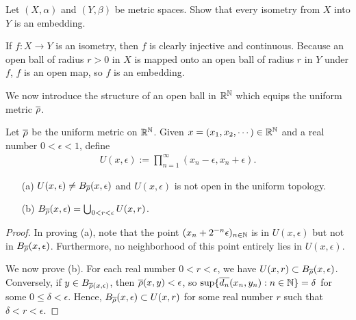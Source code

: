\begin{prob}
    Let $(X, \alpha)$ and $(Y, \beta)$ be metric spaces.
    Show that every isometry from $X$ into $Y$ is an embedding.
\end{prob}
\begin{sol}
    If $f: X\rightarrow Y$ is an isometry, then $f$ is clearly injective and continuous.
    Because an open ball of radius $r>0$ in $X$ is mapped onto an open ball of radius $r$ in $Y$ under $f$, $f$ is an open map, so $f$ is an embedding.
\end{sol}

We now introduce the structure of an open ball in ${\mathbb{R}}^{\mathbb{N}}$ which equips the uniform metric $\overline{\rho}$.
\begin{prop}
    Let $\overline{\rho}$ be the uniform metric on ${\mathbb{R}}^{\mathbb{N}}$.
    Given $x=(x_1, x_2, \cdots)\in{\mathbb{R}}^{\mathbb{N}}$ and a real number $0<\epsilon<1$, define
    \begin{align*}
        U(x, \epsilon):=\prod_{n=1}^\infty (x_n-\epsilon, x_n+\epsilon).
    \end{align*}
    \begin{enumerate}
        \item[(a)]
        {
            $U(x, \epsilon)\neq B_{\overline{\rho}}(x, \epsilon)$ and $U(x, \epsilon)$ is not open in the uniform topology.
        }
        \item[(b)]
        {
            $B_{\overline{\rho}}(x, \epsilon)=\bigcup_{0<r<\epsilon} U(x, r)$.
        }
    \end{enumerate}
\end{prop}
\begin{proof}
    In proving (a), note that the point $(x_n+2^{-n}\epsilon)_{n\in{\mathbb{N}}}$ is in $U(x, \epsilon)$ but not in $B_{\overline{\rho}}(x, \epsilon)$.
    Furthermore, no neighborhood of this point entirely lies in $U(x, \epsilon)$.
    
    We now prove (b).
    For each real number $0<r<\epsilon$, we have $U(x, r)\subset B_{\overline{\rho}}(x, \epsilon)$.
    Conversely, if $y\in B_{\overline{\rho}(x, \epsilon)}$, then $\overline{\rho}(x, y)<\epsilon$, so $\sup\{\overline{d_n}(x_n, y_n): n\in{\mathbb{N}}\}=\delta$ for some $0\leq\delta<\epsilon$.
    Hence, $B_{\overline{\rho}}(x, \epsilon)\subset U(x, r)$ for some real number $r$ such that $\delta<r<\epsilon$.
\end{proof}